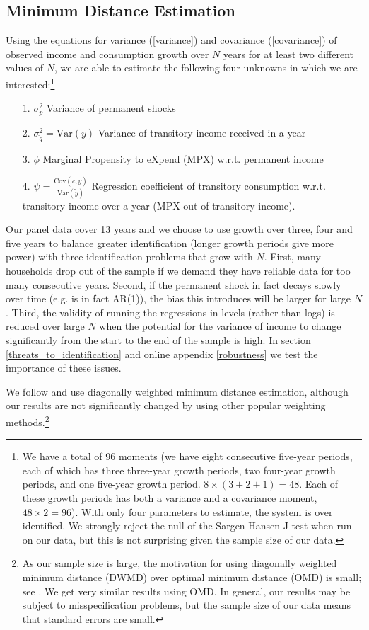 \documentclass[titlepage]{\econtex}\newcommand{\texname}{ConsumptionHeterogeneity}
\begin{document}
\subsection{Minimum Distance Estimation}
Using the equations for variance (\ref{variance}) and covariance (\ref{covariance}) of observed income and consumption growth over $N$ years for at least two different values of $N$, we are able to estimate the following four unknowns in which we are interested:\footnote{We have a total of 96 moments (we have eight consecutive five-year periods, each of which has three three-year growth periods, two four-year growth periods, and one five-year growth period. $8\times(3+2+1)=48$. Each of these growth periods has both a variance and a covariance moment, $48\times 2 = 96$). With only four parameters to estimate, the system is over identified. We strongly reject the null of the Sargen-Hansen J-test when run on our data, but this is not surprising given the sample size of our data.}
	\begin{itemize}
	\item[1.] $\sigma^2_p$ Variance of permanent shocks
	\item[2.] $\sigma^2_{\tilde{q}} = \mathrm{Var}(\tilde{y})$ Variance of transitory income received in a year
	\item[3.] $\phi$ Marginal Propensity to eXpend (MPX) w.r.t. permanent income
	\item[4.] $\psi = \frac{\mathrm{Cov}(\tilde{c},\tilde{y})}{\mathrm{Var}(\tilde{y})}$ Regression coefficient of transitory consumption w.r.t. transitory income over a year (MPX out of transitory income).
\end{itemize}
Our panel data cover 13 years and we choose to use growth over three, four and five years to balance greater identification (longer growth periods give more power) with three identification problems that grow with $N$. First, many households drop out of the sample if we demand they have reliable data for too many consecutive years. Second, if the permanent shock in fact decays slowly over time (e.g. is in fact AR(1)), the bias this introduces will be larger for large $N$. Third, the validity of running the regressions in levels (rather than logs) is reduced over large $N$ when the potential for the variance of income to change significantly from the start to the end of the sample is high. In section \ref{threats_to_identification} and online appendix \ref{robustness} we test the importance of these issues.

We follow \cite{blundell_consumption_2008} and use diagonally weighted minimum distance estimation, although our results are not significantly changed by using other popular weighting methods.\footnote{As our sample size is large, the motivation for using diagonally weighted minimum distance (DWMD) over optimal minimum distance (OMD) is small; see \cite{altonji_small-sample_1996}. We get very similar results using OMD. In general, our results may be subject to misspecification problems, but the sample size of our data means that standard errors are small.}
\end{document}
